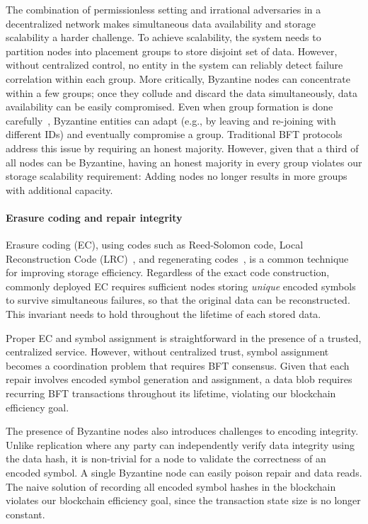The combination of permissionless setting and irrational adversaries in a decentralized network makes simultaneous data availability and storage scalability a harder challenge.
To achieve scalability, the system needs to partition nodes into placement groups to store disjoint set of data.
However, without centralized control, no entity in the system can reliably detect failure correlation within each group.
More critically, Byzantine nodes can concentrate within a few groups;
once they collude and discard the data simultaneously, data availability can be easily compromised.
Even when group formation is done carefully~\cite{elastico}, Byzantine entities can adapt (e.g., by leaving and re-joining with different IDs) and eventually compromise a group.
Traditional BFT protocols~\cite{pbft,hotstuff,bar} address this issue by requiring an honest majority.
However, given that a third of all nodes can be Byzantine, having an honest majority in every group violates our storage scalability requirement: Adding nodes no longer results in more groups with additional capacity.

\paragraph{\textbf{Erasure coding and repair integrity}}
Erasure coding (EC), using codes such as Reed-Solomon code, Local Reconstruction Code (LRC)~\cite{azure_storage}, and regenerating codes~\cite{regen_code}, is a common technique for improving storage efficiency.
Regardless of the exact code construction, commonly deployed EC requires sufficient nodes storing \emph{unique} encoded symbols to survive simultaneous failures, so that the original data can be reconstructed.
This invariant needs to hold throughout the lifetime of each stored data.

Proper EC and symbol assignment is straightforward in the presence of a trusted, centralized service.
However, without centralized trust, symbol assignment becomes a coordination problem that requires BFT consensus.
Given that each repair involves encoded symbol generation and assignment, a data blob requires recurring BFT transactions throughout its lifetime, violating our blockchain efficiency goal.

The presence of Byzantine nodes also introduces challenges to encoding integrity.
Unlike replication where any party can independently verify data integrity using the data hash, it is non-trivial for a node to validate the correctness of an encoded symbol.
A single Byzantine node can easily poison repair and data reads.
The naive solution of recording all encoded symbol hashes in the blockchain violates our blockchain efficiency goal, since the transaction state size is no longer constant.

